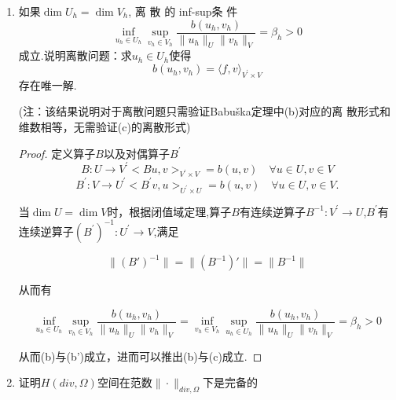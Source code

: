 \documentclass[12pt,a4paper]{article}
\begin{document}
\begin{enumerate}
\begin{proof}
			在$\eqref{eq2}$中令$w=u$,则有
			$$\sup\limits_{v\in V}\frac{b(u,v)}{||v||_V}\geq\frac{b(u,\lambda)}{||\lambda||_V}=\frac{(u,u)}{||\lambda||_V}\geq\beta||u||_U,$$
			从而$B:U^{\perp}\to V^{\prime}$满足Babuška定理的三个条件，故$B$是一个同构映射.
			
			(3) $\Rightarrow$ (1):
			
			因 (3) 成立，故$B:U^\perp\to V^{\prime}$是一个同构，对给定的$v\in V$,
			$$\begin{aligned}||v||_{V}&=\sup_{g\in V^{\prime}}\frac{\langle g,v\rangle}{||g||_{V^{\prime}}}=\sup_{u\in U^{\perp}}\frac{\langle Bu,v\rangle}{||Bu||_{V^{\prime}}}\\&=\sup_{u\in U^{\perp}}\frac{b(u,v)}{||Bu||_{V^{\prime}}}\leq\sup_{u\in U^{\perp}}\frac{b(u,v)}{\beta||u||_{U}}\leq\frac{1}{\beta}\sup_{u\in U}\frac{b(u,v)}{||u||_{U}},\end{aligned}$$
			从而 (1)成立，证毕.
			
			
		\end{proof}
		\item 如果$\dim U_h= \dim V_h$, 离 散 的 inf-sup条 件 
		$$\inf_{u_h\in U_h}\sup_{v_h\in V_h}\frac{b(u_h,v_h)}{\|u_h\|_U\|v_h\|_V}=\beta_h>0$$
		成立.说明离散问题：求$u_h\in U_h$使得
		$$b(u_h,v_h)=\langle f,v\rangle_{V^{\prime}\times V}$$
		存在唯一解.
		
		(注：该结果说明对于离散问题只需验证Babuška定理中(b)对应的离
		散形式和维数相等，无需验证(c)的离散形式) 
		
		\begin{proof}
			定义算子$B$以及对偶算子$B^\prime$
			$$
			B:U\to V^{\prime}<Bu,v>_{V^{\prime}\times V}=b(u,v)\quad\forall u\in U,v\in V$$
			$$B^{\prime}:V\to U^{\prime}<B^{\prime}v,u>_{U^{\prime}\times U}=b(u,v)\quad\forall u\in U,v\in V.
			$$
			
			当$\dim U= \dim V$时，根据闭值域定理,算子$B$有连续逆算子${B}^{-1} :V^\prime \rightarrow U$,$B^\prime$有连续逆算子${(B^\prime)}^{-1} :U^\prime \rightarrow V$,满足
			
			$$
			\|(B')^{-1}\|=\|(B^{-1})'\|=\|B^{-1}\|
			$$
			
			从而有
			
			$$\inf_{u_h\in U_h}\sup_{v_h\in V_h}\frac{b(u_h,v_h)}{\|u_h\|_U\|v_h\|_V}=\inf_{v_h\in V_h}\sup_{u_h\in U_h}\frac{b(u_h,v_h)}{\|u_h\|_U\|v_h\|_V}=\beta_h>0$$
			
			从而(b)与(b')成立，进而可以推出(b)与(c)成立.
			
		\end{proof}
		\item 证明$H(div,\Omega)$空间在范数$\|\cdot\|_{div,\Omega}$下是完备的
		

\end{enumerate}
\end{document}
